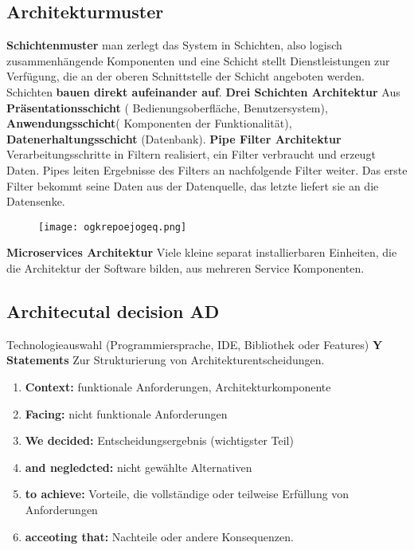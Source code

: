 \documentclass{book}
\begin{document}
    \subsection{Architekturmuster}
    \textbf{Schichtenmuster}
    \newline man zerlegt das System in Schichten, also logisch zusammenhängende Komponenten und eine Schicht stellt Dienstleistungen zur Verfügung, die an der oberen Schnittstelle der Schicht angeboten werden. Schichten\textbf{ bauen direkt aufeinander auf}.
    \newline
    \textbf{Drei Schichten Architektur}
    Aus \textbf{Präsentationsschicht }( Bedienungsoberfläche, Benutzersystem), \textbf{Anwendungsschicht}( Komponenten der Funktionalität), \textbf{Datenerhaltungsschicht} (Datenbank).
    \newline
    \textbf{Pipe Filter Architektur}
    Verarbeitungsschritte in Filtern realisiert, ein Filter verbraucht und erzeugt Daten.
    Pipes leiten Ergebnisse des Filters an nachfolgende Filter weiter.
    Das erste Filter bekommt seine Daten aus der Datenquelle, das letzte liefert sie an die Datensenke.
    \begin{figure}[h]
        \centering
        \texttt{[image: ogkrepoejogeq.png]}
        \label{fig:enter-label}
    \end{figure}
    \newline
    \textbf{Microservices Architektur}
    Viele kleine separat installierbaren Einheiten, die die Architektur der Software bilden, aus mehreren Service Komponenten.

    \subsection{Architecutal decision AD}
    Technologieauswahl (Programmiersprache, IDE, Bibliothek oder Features)
    \newline
    \textbf{Y Statements}
    Zur Strukturierung von Architekturentscheidungen.
    \begin{enumerate}
        \item \textbf{Context:} funktionale Anforderungen, Architekturkomponente
        \item \textbf{Facing:} nicht funktionale Anforderungen
        \item \textbf{We decided:} Entscheidungsergebnis (wichtigster Teil)
        \item \textbf{and negledcted:} nicht gewählte Alternativen
        \item \textbf{to achieve:} Vorteile, die vollständige oder teilweise Erfüllung von Anforderungen
        \item \textbf{acceoting that:} Nachteile oder andere Konsequenzen.
    \end{enumerate}
\end{document}
